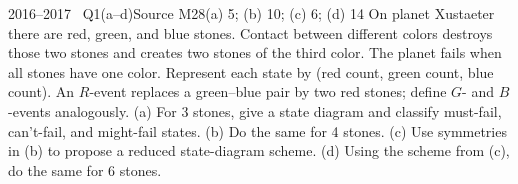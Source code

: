 \documentclass[11pt,a4paper]{article}
\begin{document}
\begin{question}{2016--2017 \textbullet\ Q1(a--d)}{Source M28}{(a) 5; (b) 10; (c) 6; (d) 14}
On planet Xustaeter there are red, green, and blue stones. Contact between different colors destroys those two stones and creates two stones of the third color. The planet fails when all stones have one color. Represent each state by (red count, green count, blue count). An $R$-event replaces a green--blue pair by two red stones; define $G$- and $B$-events analogously.
(a) For 3 stones, give a state diagram and classify must-fail, can't-fail, and might-fail states.
(b) Do the same for 4 stones.
(c) Use symmetries in (b) to propose a reduced state-diagram scheme.
(d) Using the scheme from (c), do the same for 6 stones.
\end{question}
\end{document}
